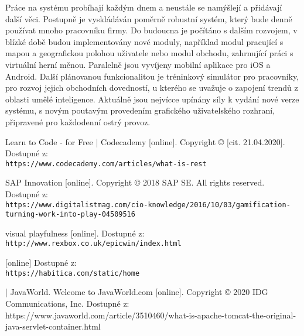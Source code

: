 \documentclass[12pt]{article}
\begin{document}
{Práce na systému probíhají každým dnem a neustále se namýšlejí a přidávají další věci.
Postupně je vyskládáván poměrně robustní systém, který bude denně používat mnoho pracovníku firmy.
Do budoucna je počítáno s dalším rozvojem, v blízké době budou implementovány nové moduly,
například modul pracující s mapou a geografickou polohou uživatele nebo modul obchodu, zahrnující práci s virtuální herní měnou.
Paralelně jsou vyvíjeny mobilní aplikace pro iOS a Android.
Další plánovanou funkcionalitou je tréninkový simulátor pro pracovníky, pro rozvoj jejich obchodních dovedností,
u kterého se uvažuje o zapojení trendů z oblasti umělé inteligence.
Aktuálně jsou nejvícce upínány síly k vydání nové verze systému, s novým poutavým provedením grafického uživatelského rozhraní,
připravené pro každodenní ostrý provoz.


\begin{literatura}

{
 Learn to Code - for Free | Codecademy [online]. 
Copyright © [cit. 21.04.2020]. 
Dostupné z:
\\
\texttt{https://www.codecademy.com/articles/what-is-rest}
}

{
SAP Innovation [online]. Copyright © 2018 SAP SE. All rights reserved.
Dostupné z:
\\
\texttt{https://www.digitalistmag.com/cio-knowledge/2016/10/03/gamification-turning-work-into-play-04509516}
}

{
 visual playfulness [online].
Dostupné z:
\texttt{http://www.rexbox.co.uk/epicwin/index.html}
}

{
 [online]
Dostupné z: 
\\
\texttt{https://habitica.com/static/home}
}

{
 | JavaWorld. 
Welcome to JavaWorld.com [online]. Copyright © 2020 IDG Communications, Inc. 
Dostupné z: 
\\
https://www.javaworld.com/article/3510460/what-is-apache-tomcat-the-original-java-servlet-container.html
}


\end{literatura}}
\end{document}
